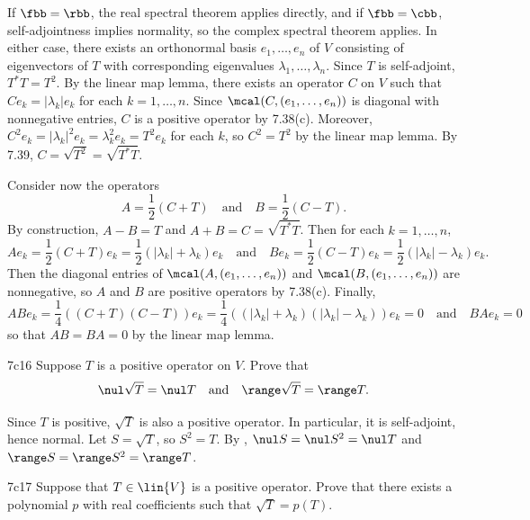 \begin{sol}
    If $\fbb = \rbb$, the real spectral theorem applies directly, and if $\fbb = \cbb$, self-adjointness implies normality, so the complex spectral theorem applies.
    In either case, there exists an orthonormal basis $e_1, \ldots, e_n$ of $V$ consisting of eigenvectors of $T$ with corresponding eigenvalues $\lambda_1, \ldots, \lambda_n$.
    Since $T$ is self-adjoint, $T^\ast T = T^2$.
    By the linear map lemma, there exists an operator $C$ on $V$ such that $C e_k = |\lambda_k| e_k$ for each $k = 1, \ldots, n$.
    Since $\mcal(C, (e_1, \ldots, e_n))$ is diagonal with nonnegative entries, $C$ is a positive operator by 7.38(c).
    Moreover, $C^2 e_k = |\lambda_k|^2 e_k = \lambda_k^2 e_k = T^2 e_k$ for each $k$, so $C^2 = T^2$ by the linear map lemma.
    By 7.39, $C = \sqrt{T^2} = \sqrt{T^\ast T}$.

    Consider now the operators
    \[
        A = \frac{1}{2}(C + T) \quad \text{and} \quad B = \frac{1}{2}(C - T).
    \]
    By construction, $A - B = T$ and $A + B = C = \sqrt{T^\ast T}$.
    Then for each $k = 1, \ldots, n$,
    \[
        A e_k = \frac{1}{2}(C + T) e_k = \frac{1}{2}(|\lambda_k| + \lambda_k) e_k \quad \text{and} \quad B e_k = \frac{1}{2}(C - T) e_k = \frac{1}{2}(|\lambda_k| - \lambda_k) e_k.
    \]
    Then the diagonal entries of $\mcal(A, (e_1, \ldots, e_n))$ and $\mcal(B, (e_1, \ldots, e_n))$ are nonnegative, so $A$ and $B$ are positive operators by 7.38(c).
    Finally,
    \[
        AB e_k = \frac{1}{4}((C + T)(C - T)) e_k = \frac{1}{4}((|\lambda_k| + \lambda_k)(|\lambda_k| - \lambda_k)) e_k = 0 \quad \text{and} \quad BA e_k = 0
    \]
    so that $AB = BA = 0$ by the linear map lemma.
\end{sol}

\begin{exercise}{7c16}
    Suppose $T$ is a positive operator on $V$.
    Prove that
    \[
        \nul \sqrt{T} = \nul T \quad \text{and} \quad \range \sqrt{T} = \range T.
    \]
\end{exercise}

\begin{sol}
    Since $T$ is positive, $\sqrt T$ is also a positive operator.
    In particular, it is self-adjoint, hence normal.
    Let $S = \sqrt{T}$, so $S^2 = T$.
    By , $\nul S = \nul S^2 = \nul T$ and $\range S = \range S^2 = \range T$.
\end{sol}

\begin{exercise}{7c17}
    Suppose that $T \in \lin{V}$ is a positive operator.
    Prove that there exists a polynomial $p$ with real coefficients such that $\sqrt{T} = p(T)$.
\end{exercise}

